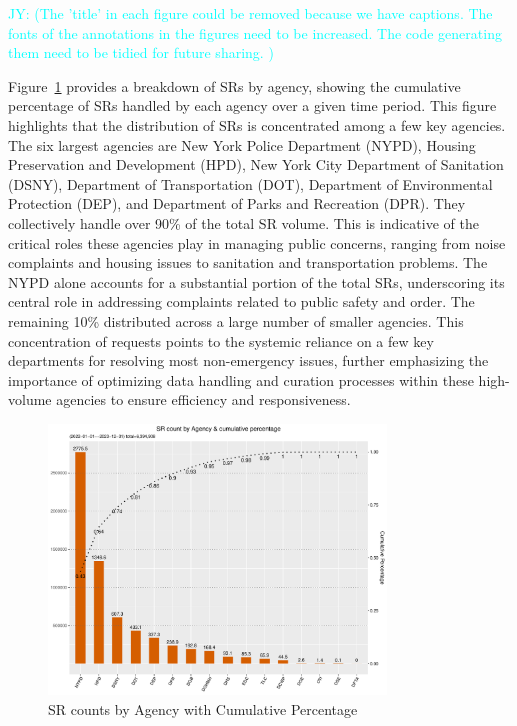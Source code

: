 \documentclass[linenumber]{jdsart}
\newcommand{\jy}[1]{\textcolor{cyan}{JY: (#1)}}
\begin{document}
\jy{The 'title' in each figure could be removed because we have
  captions. The fonts of the annotations in the figures need to be
  increased. The code generating them need to be tidied for future
  sharing.
}


Figure~\ref{fig:SRcountbyAgency} provides a breakdown of SRs by
agency, showing the cumulative percentage of SRs handled by each
agency over a given time period. This figure highlights that the
distribution of SRs is concentrated among a few key agencies. The six
largest agencies are New York Police Department (NYPD), 
Housing Preservation and Development (HPD),
New York City Department of Sanitation (DSNY), Department of
Transportation (DOT), Department of Environmental Protection (DEP),
and Department of Parks and Recreation (DPR).
They collectively handle over 90\% of the total SR volume. This is
indicative of the critical roles these agencies play in managing
public concerns, ranging from noise complaints and housing issues to
sanitation and transportation problems. The NYPD alone accounts for a
substantial portion of the total SRs, underscoring its central role in
addressing complaints related to public safety and order. The
remaining 10\% distributed across a large number of smaller
agencies. This concentration of requests points to the systemic
reliance on a few key departments for resolving most non-emergency
issues, further emphasizing the importance of optimizing data handling
and curation processes within these high-volume agencies to ensure
efficiency and responsiveness.


\begin{figure}[tbp]
	\centering
	\includegraphics[width=0.8\textwidth]{SRs_by_Agency.pdf}
  	\caption{SR counts by Agency with Cumulative Percentage}
	\label{fig:SRcountbyAgency}
\end{figure}
\end{document}
